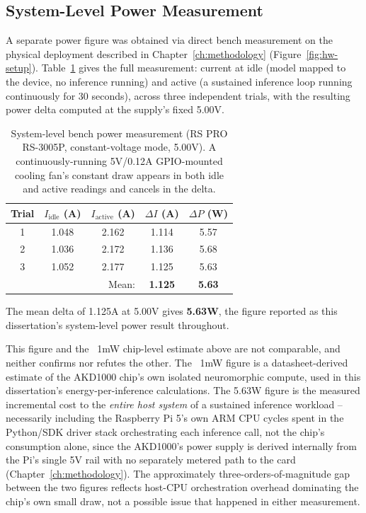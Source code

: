\subsection{System-Level Power Measurement}

A separate power figure was obtained via direct bench measurement on the physical deployment described in Chapter~\ref{ch:methodology} (Figure~\ref{fig:hw-setup}). Table~\ref{tab:power-trials} gives the full measurement: current at idle (model mapped to the device, no inference running) and active (a sustained inference loop running continuously for 30 seconds), across three independent trials, with the resulting power delta computed at the supply's fixed 5.00V.

\begin{table}[H]
\centering
\caption{System-level bench power measurement (RS PRO RS-3005P, constant-voltage mode, 5.00V). A continuously-running 5V/0.12A GPIO-mounted cooling fan's constant draw appears in both idle and active readings and cancels in the delta.}
\label{tab:power-trials}
\begin{tabular}{ccccc}
\toprule
Trial & $I_{\text{idle}}$ (A) & $I_{\text{active}}$ (A) & $\Delta I$ (A) & $\Delta P$ (W) \\
\midrule
1 & 1.048 & 2.162 & 1.114 & 5.57 \\
2 & 1.036 & 2.172 & 1.136 & 5.68 \\
3 & 1.052 & 2.177 & 1.125 & 5.63 \\
\midrule
\multicolumn{3}{r}{Mean:} & \textbf{1.125} & \textbf{5.63} \\
\bottomrule
\end{tabular}
\end{table}

The mean delta of 1.125A at 5.00V gives \textbf{5.63W}, the figure reported as this dissertation's system-level power result throughout.


This figure and the ~1mW chip-level estimate above are not comparable, and neither confirms nor refutes the other. The ~1mW figure is a datasheet-derived estimate of the AKD1000 
chip's own isolated neuromorphic compute, used in this dissertation's 
energy-per-inference calculations. The 5.63W figure is the measured incremental cost to the \emph{entire host system} of a sustained inference workload -- necessarily including the 
Raspberry Pi 5's own ARM CPU cycles spent in the Python/SDK driver stack orchestrating each inference call, not the chip's consumption alone, since the AKD1000's power supply is derived
internally from the Pi's single 5V rail with no separately metered path to the card (Chapter~\ref{ch:methodology}). The approximately three-orders-of-magnitude gap between the two 
figures reflects host-CPU orchestration overhead dominating the chip's own small draw, not a possible issue that happened in either measurement.